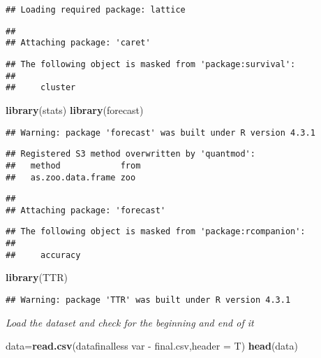 \documentclass[
]{article}
\newenvironment{Shaded}{\begin{snugshade}}{\end{snugshade}}
\newcommand{\AttributeTok}[1]{\textcolor[rgb]{0.13,0.29,0.53}{#1}}
\newcommand{\FunctionTok}[1]{\textcolor[rgb]{0.13,0.29,0.53}{\textbf{#1}}}
\newcommand{\NormalTok}[1]{#1}
\newcommand{\OtherTok}[1]{\textcolor[rgb]{0.56,0.35,0.01}{#1}}
\newcommand{\StringTok}[1]{\textcolor[rgb]{0.31,0.60,0.02}{#1}}
\begin{document}
\begin{verbatim}
## Loading required package: lattice
\end{verbatim}

\begin{verbatim}
## 
## Attaching package: 'caret'
\end{verbatim}

\begin{verbatim}
## The following object is masked from 'package:survival':
## 
##     cluster
\end{verbatim}

\begin{Shaded}
\begin{Highlighting}[]
\FunctionTok{library}\NormalTok{(stats)}
\FunctionTok{library}\NormalTok{(forecast)}
\end{Highlighting}
\end{Shaded}

\begin{verbatim}
## Warning: package 'forecast' was built under R version 4.3.1
\end{verbatim}

\begin{verbatim}
## Registered S3 method overwritten by 'quantmod':
##   method            from
##   as.zoo.data.frame zoo
\end{verbatim}

\begin{verbatim}
## 
## Attaching package: 'forecast'
\end{verbatim}

\begin{verbatim}
## The following object is masked from 'package:rcompanion':
## 
##     accuracy
\end{verbatim}

\begin{Shaded}
\begin{Highlighting}[]
\FunctionTok{library}\NormalTok{(TTR)}
\end{Highlighting}
\end{Shaded}

\begin{verbatim}
## Warning: package 'TTR' was built under R version 4.3.1
\end{verbatim}

\emph{Load the dataset and check for the beginning and end of it}

\begin{Shaded}
\begin{Highlighting}[]
\NormalTok{data}\OtherTok{=}\FunctionTok{read.csv}\NormalTok{(}\StringTok{\textquotesingle{}datafinalless var {-} final.csv\textquotesingle{}}\NormalTok{,}\AttributeTok{header =}\NormalTok{ T)}
\FunctionTok{head}\NormalTok{(data)}
\end{Highlighting}
\end{Shaded}
\end{document}
